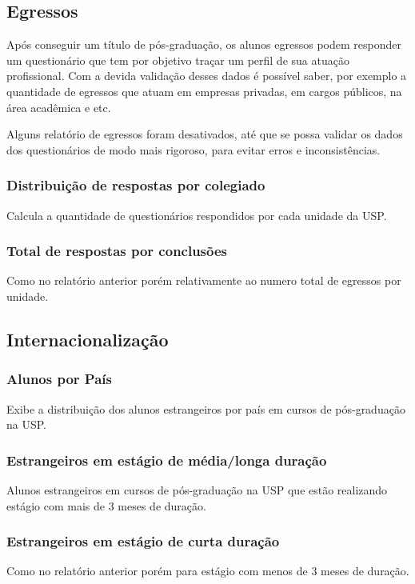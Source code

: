 \subsection{Egressos}
Após conseguir um título de pós-graduação, os alunos egressos podem responder um questionário que tem por objetivo traçar um perfil de sua atuação profissional. Com a devida validação desses dados é possível saber, por exemplo a quantidade de egressos que atuam em empresas privadas, em cargos públicos, na área acadêmica e etc.
\par Alguns relatório de egressos foram desativados, até que se possa validar os dados dos questionários de modo mais rigoroso, para evitar erros e inconsistências. 

\subsubsection{Distribuição de respostas por colegiado}
Calcula a quantidade de questionários respondidos por cada unidade da USP.

\subsubsection{Total de respostas por conclusões}
Como no relatório anterior porém relativamente ao numero total de egressos por unidade.

\subsection{Internacionalização}

\subsubsection{Alunos por País}
Exibe a distribuição dos alunos estrangeiros por país em cursos de pós-graduação na USP.

\subsubsection{Estrangeiros em estágio de média/longa duração}
Alunos estrangeiros em cursos de pós-graduação na USP que estão realizando estágio com mais de 3 meses de duração.

\subsubsection{Estrangeiros em estágio de curta duração}
Como no relatório anterior porém para estágio com menos de 3 meses de duração.

